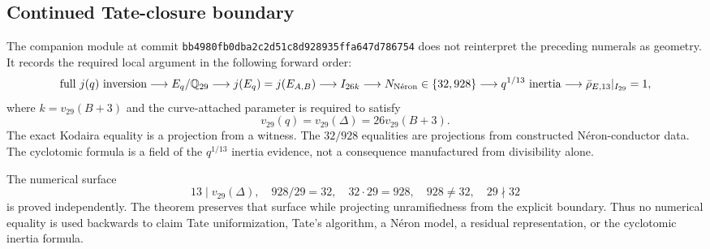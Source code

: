 \subsection{Continued Tate-closure boundary}

The companion module
 at commit
\texttt{bb4980fb0dba2c2d51c8d928935ffa647d786754} does not reinterpret the
preceding numerals as geometry.  It records the required local argument in
the following forward order:
\[
 \text{full }j(q)\text{ inversion}
 \longrightarrow E_q/\mathbb{Q}_{29}
 \longrightarrow j(E_q)=j(E_{A,B})
 \longrightarrow I_{26k}
 \longrightarrow N_{\mathrm{N\acute eron}}\in\{32,928\}
 \longrightarrow q^{1/13}\text{ inertia}
 \longrightarrow \bar\rho_{E,13}|_{I_{29}}=1,
\]
where $k=v_{29}(B+3)$ and the curve-attached parameter is required to
satisfy
\[
 v_{29}(q)=v_{29}(\Delta)=26v_{29}(B+3).
\]
The exact Kodaira equality is a projection from a
 witness.  The $32/928$ equalities are projections
from constructed N\'eron-conductor data.  The cyclotomic formula is a field
of the $q^{1/13}$ inertia evidence, not a consequence manufactured from
divisibility alone.

The numerical surface
\[
 13\mid v_{29}(\Delta),\quad 928/29=32,\quad
 32\cdot29=928,\quad 928\ne32,\quad 29\nmid32
\]
is proved independently.  The theorem
 preserves that surface while
projecting unramifiedness from the explicit
 boundary.  Thus no numerical equality is
used backwards to claim Tate uniformization, Tate's algorithm, a N\'eron
model, a residual representation, or the cyclotomic inertia formula.
